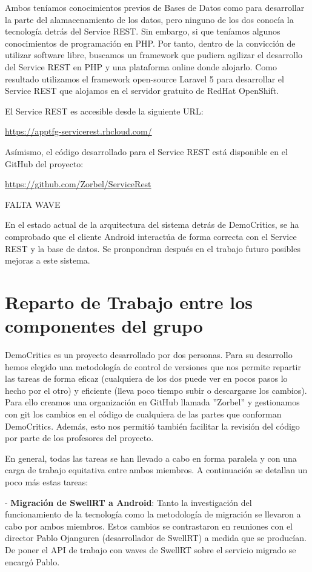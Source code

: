Ambos teníamos conocimientos previos de Bases de Datos como para desarrollar la parte del alamacenamiento de los datos, pero ninguno de los dos conocía la tecnología detrás del Service REST. Sin embargo, si que teníamos algunos conocimientos de programación en PHP. Por tanto, dentro de la convicción de utilizar software libre, buscamos un framework que pudiera agilizar el desarrollo del Service REST en PHP y una plataforma online donde alojarlo. Como resultado utilizamos el framework open-source Laravel 5 para desarrollar el Service REST que alojamos en el servidor gratuito de RedHat OpenShift. 

El Service REST es accesible desde la siguiente URL:

\url{https://apptfg-servicerest.rhcloud.com/}

Asímismo, el código desarrollado para el Service REST está disponible en el GitHub del proyecto:

\url{https://github.com/Zorbel/ServiceRest}

FALTA WAVE

En el estado actual de la arquitectura del sistema detrás de DemoCritics, se ha comprobado que el cliente Android interactúa de forma correcta con el Service REST y la base de datos. Se pronpondran después en el trabajo futuro posibles mejoras a este sistema.

\section{Reparto de Trabajo entre los componentes del grupo} 

DemoCritics es un proyecto desarrollado por dos personas. Para su desarrollo hemos elegido una metodología de control de versiones que nos permite repartir las tareas de forma eficaz (cualquiera de los dos puede ver en pocos pasos lo hecho por el otro) y eficiente (lleva poco tiempo subir o descargarse los cambios). Para ello creamos una organización en GitHub llamada ''Zorbel'' y gestionamos con git los cambios en el código de cualquiera de las partes que conforman DemoCritics. Además, esto nos permitió también facilitar la revisión del código por parte de los profesores del proyecto. 

En general, todas las tareas se han llevado a cabo en forma paralela y con una carga de trabajo equitativa entre ambos miembros. A continuación se detallan un poco más estas tareas:

- \textbf{Migración de SwellRT a Android}: Tanto la investigación del funcionamiento de la tecnología como la metodología de migración se llevaron a cabo por ambos miembros. Estos cambios se contrastaron en reuniones con el director Pablo Ojanguren (desarrollador de SwellRT) a medida que se producían. De poner el API de trabajo con waves de SwellRT sobre el servicio migrado se encargó Pablo.

